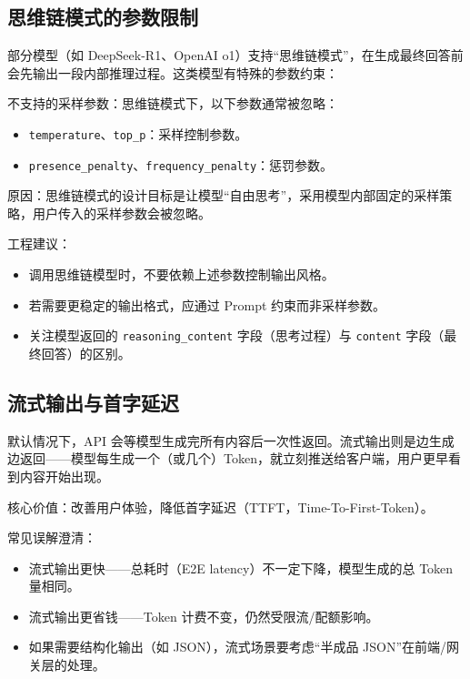 \documentclass[9pt,a4paper,twocolumn]{ctexart}
\begin{document}
\subsection*{思维链模式的参数限制}


部分模型（如 DeepSeek-R1、OpenAI o1）支持“思维链模式”，在生成最终回答前会先输出一段内部推理过程。这类模型有特殊的参数约束：



不支持的采样参数：思维链模式下，以下参数通常被忽略：


\begin{itemize}[itemsep=1pt, topsep=2pt]
  \item \texttt{temperature}、\texttt{top\_p}：采样控制参数。
  \item \texttt{presence\_penalty}、\texttt{frequency\_penalty}：惩罚参数。
\end{itemize}


原因：思维链模式的设计目标是让模型“自由思考”，采用模型内部固定的采样策略，用户传入的采样参数会被忽略。



工程建议：


\begin{itemize}[itemsep=1pt, topsep=2pt]
  \item 调用思维链模型时，不要依赖上述参数控制输出风格。
  \item 若需要更稳定的输出格式，应通过 Prompt 约束而非采样参数。
  \item 关注模型返回的 \texttt{reasoning\_content} 字段（思考过程）与 \texttt{content} 字段（最终回答）的区别。
\end{itemize}


\subsection*{流式输出与首字延迟}


默认情况下，API 会等模型生成完所有内容后一次性返回。流式输出则是边生成边返回——模型每生成一个（或几个）Token，就立刻推送给客户端，用户更早看到内容开始出现。



核心价值：改善用户体验，降低首字延迟（TTFT，Time-To-First-Token）。



常见误解澄清：


\begin{itemize}[itemsep=1pt, topsep=2pt]
  \item 流式输出更快——总耗时（E2E latency）不一定下降，模型生成的总 Token 量相同。
  \item 流式输出更省钱——Token 计费不变，仍然受限流/配额影响。
  \item 如果需要结构化输出（如 JSON），流式场景要考虑“半成品 JSON”在前端/网关层的处理。
\end{itemize}
\end{document}
